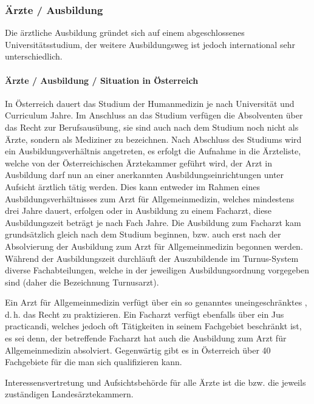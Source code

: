 \documentclass[
ngerman,
paper=a4,
asymmetric,
fontsize=10pt,
draft=false,
numbers=noenddot,
bibtotocnumbered,
footnotes=multiple,
]{scrreprt}
\begin{document}
\subsubsection{Ärzte / Ausbildung}

Die ärztliche Ausbildung gründet sich auf einem
abgeschlossenes Universitätsstudium, der weitere
Ausbildungsweg ist jedoch international sehr
unterschiedlich.

\paragraph{Ärzte / Ausbildung / Situation in Österreich}

In Österreich dauert das Studium der Humanmedizin je nach
Universität und Curriculum  Jahre. Im Anschluss an das
Studium verfügen die Absolventen  über das Recht zur
Berufsausübung, sie sind auch nach dem
Studium noch nicht als Ärzte, sondern als Mediziner zu
bezeichnen. Nach Abschluss des Studiums wird ein
Ausbildungsverhältnis angetreten, es erfolgt die Aufnahme in
die Ärzteliste, welche von der Österreichischen Ärztekammer
geführt wird, der Arzt in Ausbildung darf nun an einer
anerkannten Ausbildungseinrichtungen unter 
Aufsicht ärztlich tätig werden. Dies kann entweder im Rahmen
eines Ausbildungsverhältnisses zum Arzt für Allgemeinmedizin,
welches mindestens drei Jahre dauert, erfolgen oder in Ausbildung zu
einem Facharzt, diese Ausbildungszeit beträgt je nach Fach
 Jahre. Die Ausbildung zum Facharzt kam grundsätzlich
gleich nach dem Studium beginnen, bzw. auch erst nach der
Absolvierung der Ausbildung zum Arzt für Allgemeinmedizin
begonnen werden. Während der Ausbildungszeit durchläuft der
Auszubildende  im Turnus-System diverse
Fachabteilungen, welche in der jeweiligen Ausbildungsordnung
vorgegeben sind (daher die Bezeichnung Turnusarzt). 

Ein Arzt für Allgemeinmedizin verfügt über ein so genanntes
uneingeschränktes , d.\,h. das Recht zu
praktizieren. Ein Facharzt verfügt ebenfalls über ein Jus
practicandi, welches jedoch oft Tätigkeiten in seinem
Fachgebiet beschränkt ist, es sei denn, der betreffende
Facharzt hat auch die Ausbildung zum Arzt für
Allgemeinmedizin absolviert. Gegenwärtig gibt es in
Österreich über 40 Fachgebiete für die man sich
qualifizieren kann.

Interessensvertretung und Aufsichtsbehörde für alle Ärzte
ist die  bzw. die jeweils
zuständigen Landesärztekammern.
\end{document}
